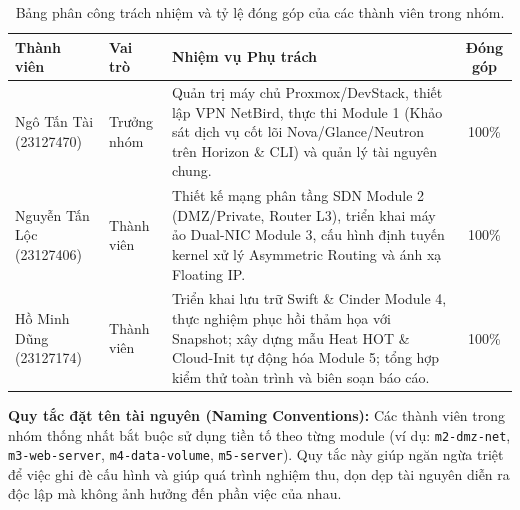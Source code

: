 \begin{table}[H]
\centering
\small
\begin{tabularx}{\linewidth}{|l|l|>{\raggedright\arraybackslash}X|c|}
\hline
\textbf{Thành viên} & \textbf{Vai trò} & \textbf{Nhiệm vụ Phụ trách} & \textbf{Đóng góp} \\ \hline
Ngô Tấn Tài (23127470) & Trưởng nhóm & Quản trị máy chủ Proxmox/DevStack, thiết lập VPN NetBird, thực thi Module 1 (Khảo sát dịch vụ cốt lõi Nova/Glance/Neutron trên Horizon \& CLI) và quản lý tài nguyên chung. & 100\% \\ \hline
Nguyễn Tấn Lộc (23127406) & Thành viên & Thiết kế mạng phân tầng SDN Module 2 (DMZ/Private, Router L3), triển khai máy ảo Dual-NIC Module 3, cấu hình định tuyến kernel xử lý Asymmetric Routing và ánh xạ Floating IP. & 100\% \\ \hline
Hồ Minh Dũng (23127174) & Thành viên & Triển khai lưu trữ Swift \& Cinder Module 4, thực nghiệm phục hồi thảm họa với Snapshot; xây dựng mẫu Heat HOT \& Cloud-Init tự động hóa Module 5; tổng hợp kiểm thử toàn trình và biên soạn báo cáo. & 100\% \\ \hline
\end{tabularx}
\caption{Bảng phân công trách nhiệm và tỷ lệ đóng góp của các thành viên trong nhóm.}
\label{tab:team_assignment}
\end{table}

\noindent \textbf{Quy tắc đặt tên tài nguyên (Naming Conventions):} Các thành viên trong nhóm thống nhất bắt buộc sử dụng tiền tố theo từng module (ví dụ: \texttt{m2-dmz-net}, \texttt{m3-web-server}, \texttt{m4-data-volume}, \texttt{m5-server}). Quy tắc này giúp ngăn ngừa triệt để việc ghi đè cấu hình và giúp quá trình nghiệm thu, dọn dẹp tài nguyên diễn ra độc lập mà không ảnh hưởng đến phần việc của nhau.


